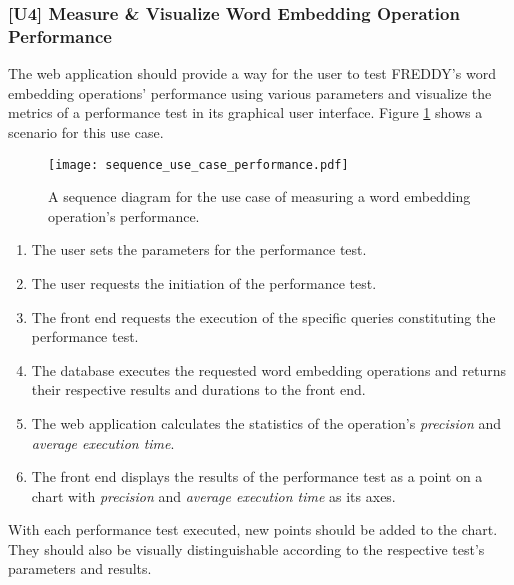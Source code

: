 \subsubsection{[U4] Measure \& Visualize Word Embedding Operation Performance}
The web application should provide a way for the user to test FREDDY's word embedding operations' performance using various parameters and visualize the metrics of a performance test in its graphical user interface. Figure \ref{fig:use_case_performance} shows a scenario for this use case.
\begin{figure}
	\centering\texttt{[image: sequence\_use\_case\_performance.pdf]}
	\caption{A sequence diagram for the use case of measuring a word embedding operation's performance.}
	\label{fig:use_case_performance}
\end{figure}
\begin{enumerate}
	\item The user sets the parameters for the performance test.
	\item The user requests the initiation of the performance test.
	\item The front end requests the execution of the specific queries constituting the performance test.
	\item The database executes the requested word embedding operations and returns their respective results and durations to the front end.
	\item The web application calculates the statistics of the operation's \textit{precision} and \textit{average execution time}.
	\item The front end displays the results of the performance test as a point on a chart with \textit{precision} and \textit{average execution time} as its axes.
\end{enumerate}
With each performance test executed, new points should be added to the chart. They should also be visually distinguishable according to the respective test's parameters and results.

